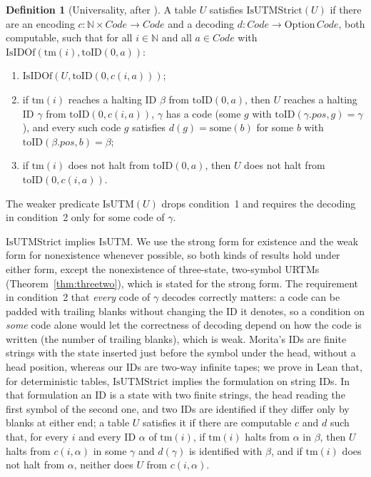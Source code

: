 \documentclass{article}
\theoremstyle{definition}
\newtheorem{definition}[theorem]{Definition}
\theoremstyle{remark}
\newcommand{\Code}{\mathit{Code}}
\newcommand{\pos}{\mathit{pos}}
\begin{document}
\begin{definition}[Universality, after {\cite[Def.~7.1]{Morita17}}]
\label{def:univ}
A table $U$ satisfies $\mathrm{IsUTMStrict}(U)$ if there are an encoding $c:\mathbb{N}\times\Code\to\Code$ and a decoding $d:\Code\to\mathrm{Option}\,\Code$, both computable, such that for all $i\in\mathbb{N}$ and all $a\in\Code$ with $\mathrm{IsIDOf}(\mathrm{tm}(i),\mathrm{toID}(0,a))$:
\begin{enumerate}
\item $\mathrm{IsIDOf}(U,\mathrm{toID}(0,c(i,a)))$;
\item if $\mathrm{tm}(i)$ reaches a halting ID $\beta$ from $\mathrm{toID}(0,a)$, then $U$ reaches a halting ID $\gamma$ from $\mathrm{toID}(0,c(i,a))$, $\gamma$ has a code (some $g$ with $\mathrm{toID}(\gamma.\pos,g)=\gamma$), and every such code $g$ satisfies $d(g)=\mathrm{some}(b)$ for some $b$ with $\mathrm{toID}(\beta.\pos,b)=\beta$;
\item if $\mathrm{tm}(i)$ does not halt from $\mathrm{toID}(0,a)$, then $U$ does not halt from $\mathrm{toID}(0,c(i,a))$.
\end{enumerate}
The weaker predicate $\mathrm{IsUTM}(U)$ drops condition~1 and requires the decoding in condition~2 only for some code of $\gamma$.
\end{definition}

$\mathrm{IsUTMStrict}$ implies $\mathrm{IsUTM}$.
We use the strong form for existence and the weak form for nonexistence whenever possible, so both kinds of results hold under either form, except the nonexistence of three-state, two-symbol URTMs (Theorem~\ref{thm:threetwo}), which is stated for the strong form.
The requirement in condition~2 that \emph{every} code of $\gamma$ decodes correctly matters: a code can be padded with trailing blanks without changing the ID it denotes, so a condition on \emph{some} code alone would let the correctness of decoding depend on how the code is written (the number of trailing blanks), which is weak.
Morita's IDs are finite strings with the state inserted just before the symbol under the head, without a head position, whereas our IDs are two-way infinite tapes; we prove in Lean that, for deterministic tables, $\mathrm{IsUTMStrict}$ implies the formulation on string IDs. In that formulation an ID is a state with two finite strings, the head reading the first symbol of the second one, and two IDs are identified if they differ only by blanks at either end; a table $U$ satisfies it if there are computable $c$ and $d$ such that, for every $i$ and every ID $\alpha$ of $\mathrm{tm}(i)$, if $\mathrm{tm}(i)$ halts from $\alpha$ in $\beta$, then $U$ halts from $c(i,\alpha)$ in some $\gamma$ and $d(\gamma)$ is identified with $\beta$, and if $\mathrm{tm}(i)$ does not halt from $\alpha$, neither does $U$ from $c(i,\alpha)$.
\end{document}
